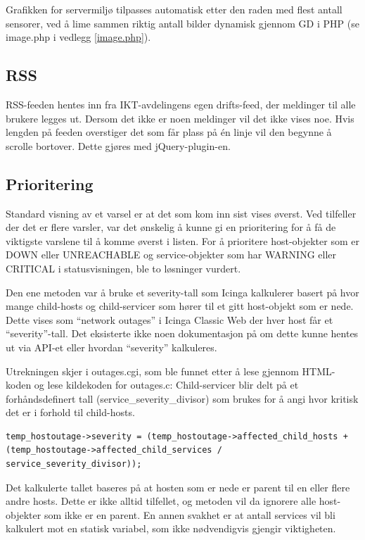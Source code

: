 Grafikken for servermiljø tilpasses automatisk etter den raden med flest antall sensorer, ved å lime sammen riktig antall bilder dynamisk gjennom GD i PHP (se image.php i vedlegg \ref{image.php}).

\subsection{RSS}

RSS-feeden hentes inn fra IKT-avdelingens egen drifts-feed, der meldinger til alle brukere legges ut. Dersom det ikke er noen meldinger vil det ikke vises noe. Hvis lengden på feeden overstiger det som får plass på én linje vil den begynne å scrolle bortover. Dette gjøres med jQuery-plugin-en\cite{jqmarquee}.

\subsection{Prioritering}
Standard visning av et varsel er at det som kom inn sist vises øverst. Ved tilfeller der det er flere varsler, var det ønskelig å kunne gi en prioritering for å få de viktigste varslene til å komme øverst i listen. For å prioritere host-objekter som er DOWN eller UNREACHABLE og service-objekter som har WARNING eller CRITICAL i statusvisningen, ble to løsninger vurdert. 

Den ene metoden var å bruke et severity-tall som Icinga kalkulerer basert på hvor mange child-hosts og child-servicer som hører til et gitt host-objekt som er nede. Dette vises som ``network outages'' i Icinga Classic Web der hver host får et ``severity''-tall. Det eksisterte ikke noen dokumentasjon på om dette kunne hentes ut via API-et eller hvordan ``severity'' kalkuleres. 

Utrekningen skjer i outages.cgi, som ble funnet etter å lese gjennom HTML-koden og lese kildekoden for outages.c\cite{dnsmichi}:
Child-servicer blir delt på et forhåndsdefinert tall (service\_severity\_divisor) som brukes for å angi hvor kritisk det er i forhold til child-hosts.

\begin{lstlisting}[style=example]
temp_hostoutage->severity = (temp_hostoutage->affected_child_hosts + (temp_hostoutage->affected_child_services / service_severity_divisor));
\end{lstlisting}

Det kalkulerte tallet baseres på at hosten som er nede er parent til en eller flere andre hosts. Dette er ikke alltid tilfellet, og metoden vil da ignorere alle host-objekter som ikke er en parent. En annen svakhet er at antall services vil bli kalkulert mot en statisk variabel, som ikke nødvendigvis gjengir viktigheten.

